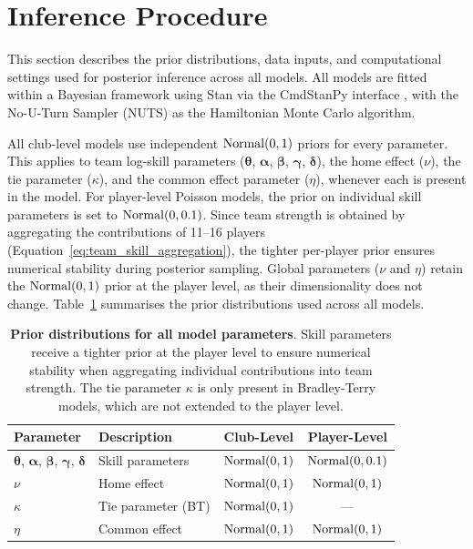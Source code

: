 \section{Inference Procedure}
\label{sec:inference_procedure}

This section describes the prior distributions, data inputs, and computational settings used for posterior inference across all models.
All models are fitted within a Bayesian framework using Stan \cite{carpenter_2017} via the CmdStanPy interface \cite{cmdstanpy}, with the No-U-Turn Sampler (NUTS) as the Hamiltonian Monte Carlo algorithm.

All club-level models use independent $\operatorname{Normal}(0, 1)$ priors for every parameter.
This applies to team log-skill parameters ($\boldsymbol{\theta}$, $\boldsymbol{\alpha}$, $\boldsymbol{\beta}$, $\boldsymbol{\gamma}$, $\boldsymbol{\delta}$), the home effect ($\nu$), the tie parameter ($\kappa$), and the common effect parameter ($\eta$), whenever each is present in the model.
For player-level Poisson models, the prior on individual skill parameters is set to $\operatorname{Normal}(0, 0.1)$.
Since team strength is obtained by aggregating the contributions of 11--16 players (Equation~\ref{eq:team_skill_aggregation}), the tighter per-player prior ensures numerical stability during posterior sampling.
Global parameters ($\nu$ and $\eta$) retain the $\operatorname{Normal}(0, 1)$ prior at the player level, as their dimensionality does not change.
Table~\ref{tab:priors} summarises the prior distributions used across all models.

\begin{table}[htbp]
    \centering
    \begin{tabular}{llcc}
        \toprule
        Parameter & Description & Club-Level & Player-Level \\
        \midrule
        $\boldsymbol{\theta}$, $\boldsymbol{\alpha}$, $\boldsymbol{\beta}$, $\boldsymbol{\gamma}$, $\boldsymbol{\delta}$ & Skill parameters & $\operatorname{Normal}(0, 1)$ & $\operatorname{Normal}(0, 0.1)$ \\
        $\nu$ & Home effect & $\operatorname{Normal}(0, 1)$ & $\operatorname{Normal}(0, 1)$ \\
        $\kappa$ & Tie parameter (BT) & $\operatorname{Normal}(0, 1)$ & --- \\
        $\eta$ & Common effect & $\operatorname{Normal}(0, 1)$ & $\operatorname{Normal}(0, 1)$ \\
        \bottomrule
    \end{tabular}
    \caption{
        \textbf{Prior distributions for all model parameters}.
        Skill parameters receive a tighter prior at the player level to ensure numerical stability when aggregating individual contributions into team strength.
        The tie parameter $\kappa$ is only present in Bradley-Terry models, which are not extended to the player level.
    }
    \label{tab:priors}
\end{table}

